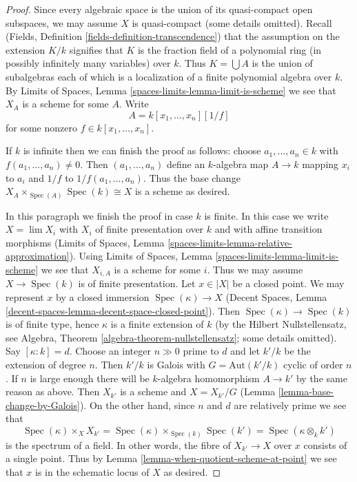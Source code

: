 \documentclass{stacks-project}
\theoremstyle{plain}
\theoremstyle{definition}
\theoremstyle{remark}
\numberwithin{equation}{subsection}
\def\lim{\mathop{\mathrm{lim}}\nolimits}
\def\Spec{\mathop{\mathrm{Spec}}}
\begin{document}
\begin{proof}
Since every algebraic space is the union of its quasi-compact open
subspaces, we may assume $X$ is quasi-compact (some details omitted).
Recall (Fields, Definition \ref{fields-definition-transcendence})
that the assumption on the extension $K/k$ signifies that
$K$ is the fraction field of a polynomial ring (in possibly infinitely
many variables) over $k$. Thus $K = \bigcup A$ is the union of subalgebras
each of which is a localization of a finite polynomial algebra over $k$.
By Limits of Spaces, Lemma \ref{spaces-limits-lemma-limit-is-scheme}
we see that $X_A$ is a scheme for some $A$. Write
$$
A = k[x_1, \ldots, x_n][1/f]
$$
for some nonzero $f \in k[x_1, \ldots, x_n]$.

\medskip\noindent
If $k$ is infinite then we can finish the proof as follows: choose
$a_1, \ldots, a_n \in k$ with $f(a_1, \ldots, a_n) \not = 0$.
Then $(a_1, \ldots, a_n)$ define an $k$-algebra map $A \to k$
mapping $x_i$ to $a_i$ and $1/f$ to $1/f(a_1, \ldots, a_n)$.
Thus the base change $X_A \times_{\Spec(A)} \Spec(k) \cong X$ is a
scheme as desired.

\medskip\noindent
In this paragraph we finish the proof in case $k$ is finite. In this
case we write $X = \lim X_i$ with $X_i$ of finite presentation over $k$
and with affine transition morphisms
(Limits of Spaces, Lemma \ref{spaces-limits-lemma-relative-approximation}).
Using Limits of Spaces, Lemma \ref{spaces-limits-lemma-limit-is-scheme}
we see that $X_{i, A}$ is a scheme for some $i$. Thus we may assume
$X \to \Spec(k)$ is of finite presentation. Let $x \in |X|$ be a closed
point. We may represent $x$ by a closed immersion
$\Spec(\kappa) \to X$
(Decent Spaces, Lemma \ref{decent-spaces-lemma-decent-space-closed-point}).
Then $\Spec(\kappa) \to \Spec(k)$ is of finite type, hence $\kappa$
is a finite extension of $k$ (by the Hilbert Nullstellensatz, see
Algebra, Theorem \ref{algebra-theorem-nullstellensatz};
some details omitted). Say $[\kappa : k] = d$. Choose an integer
$n \gg 0$ prime to $d$ and let $k'/k$ be the extension
of degree $n$. Then $k'/k$ is Galois with $G = \text{Aut}(k'/k)$
cyclic of order $n$. If $n$ is large enough there will be $k$-algebra
homomorphism $A \to k'$ by the same reason as above.
Then $X_{k'}$ is a scheme and $X = X_{k'}/G$
(Lemma \ref{lemma-base-change-by-Galois}).
On the other hand, since $n$ and $d$ are relatively prime we see that
$$
\Spec(\kappa) \times_{X} X_{k'} =
\Spec(\kappa) \times_{\Spec(k)} \Spec(k') =
\Spec(\kappa \otimes_k k')
$$
is the spectrum of a field. In other words, the fibre of $X_{k'} \to X$
over $x$ consists of a single point. Thus by
Lemma \ref{lemma-when-quotient-scheme-at-point}
we see that $x$ is in the schematic locus of $X$ as desired.
\end{proof}
\end{document}
